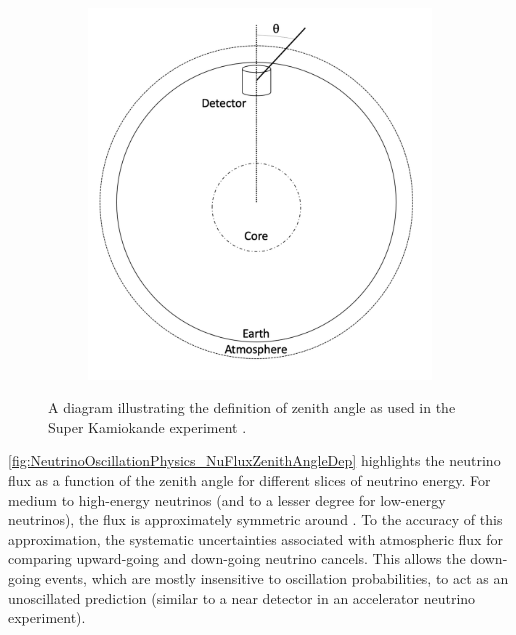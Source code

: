 \begin{figure}[h]
  \begin{subfigure}[t]{0.40\textwidth}
    \includegraphics[width=\textwidth, trim={0mm 0mm 0mm 0mm}, clip,page=1]{Figures/Theory/ZenithAngle.pdf}
  \end{subfigure}
  \caption{A diagram illustrating the definition of zenith angle as used in the Super Kamiokande experiment \cite{Ashie_2005}.}
  \label{fig:NeutrinoOscillationPhysics_ZenithAngle}
\end{figure}

\autoref{fig:NeutrinoOscillationPhysics_NuFluxZenithAngleDep} highlights the neutrino flux as a function of the zenith angle for different slices of neutrino energy. For medium to high-energy neutrinos (and to a lesser degree for low-energy neutrinos), the flux is approximately symmetric around . To the accuracy of this approximation, the systematic uncertainties associated with atmospheric flux for comparing upward-going and down-going neutrino cancels. This allows the down-going events, which are mostly insensitive to oscillation probabilities, to act as an unoscillated prediction (similar to a near detector in an accelerator neutrino experiment).

